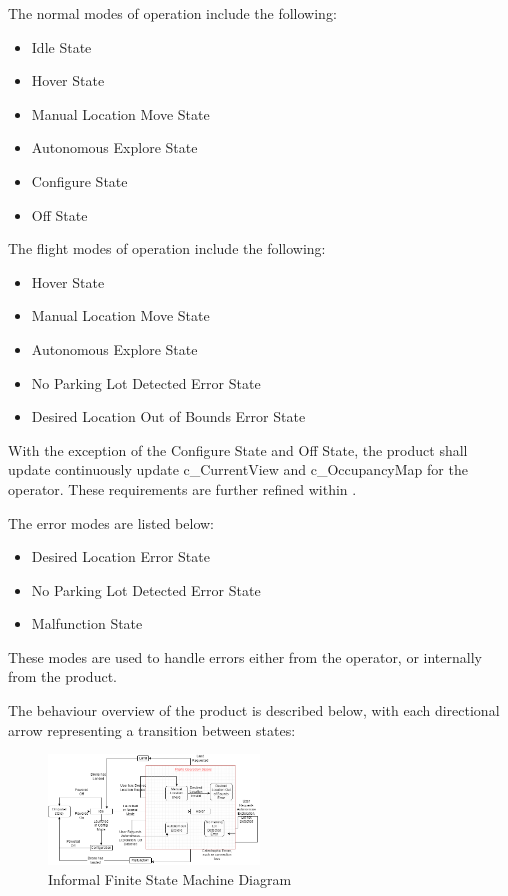 \documentclass{article}
\begin{document}
The normal modes of operation include the following:
\begin{itemize}
  \item Idle State
  \item Hover State
  \item Manual Location Move State
  \item Autonomous Explore State
  \item Configure State
  \item Off State
\end{itemize}
The flight modes of operation \label{flightModes} include the following:
\begin{itemize}
  \item Hover State
  \item Manual Location Move State
  \item Autonomous Explore State
   \item No Parking Lot Detected Error State
   \item Desired Location Out of Bounds Error State
\end{itemize}
With the exception of the Configure State and Off State, the product shall update continuously update c_CurrentView and c_OccupancyMap for the operator. These requirements are further refined within . 

The error modes are listed below:
\begin{itemize}
    \item Desired Location Error State
    \item No Parking Lot Detected Error State
    \item Malfunction State
\end{itemize}
These modes are used to handle errors either from the operator, or internally from the product. 

The behaviour overview of the product is described below, with each directional arrow representing a transition between states:
\begin{figure}[h!]
  \begin{center} 
  \caption{Informal Finite State Machine Diagram } 
  \label{InfFSM}
 
        \includegraphics[width=0.5\textwidth]{InformalFSM.png}
  \end{center}
\end{figure}
\end{document}
